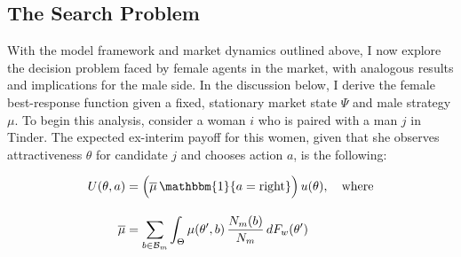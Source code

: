 \begin{comment}
\begin{equation} 
    \underbrace{\lambda_m \Big( F_m(\theta'')-F_m(\theta') \Big)}_{\text{Entering Agents}}\;=\;\underbrace{(1-\delta)N^m(\sigma)}_{\text{Exogenous Deaths}}+\quad  \underbrace{\delta N^m(\sigma)  G^m_b(1 \,|\, \sigma)\int_{\Theta}\sigma_m(\theta,1)\,dG^w_\theta(\theta \,|\, \sigma)}_{\text{Expended Budgets}} 
\end{equation} 

\begin{equation}
    \underbrace{\left(\delta  \int_{\Theta}\sigma_m(\theta,b+1)\,dw_\theta(\theta \,|\, \sigma)\right)N_mR^m_{b+1}}_{\text{Transitions into budget b}}\;=\;\underbrace{\left((1-\delta)+\delta \int_{\Theta} \sigma_m(\theta,b)\,dw_\theta(\theta \,|\, \sigma)\right)N^m R^m_{b}}_{\text{Transitions out of budget b}}
\end{equation}

\begin{equation}
    \underbrace{\lambda_m \Big(F_m(\theta'')-F_m(\theta')\Big)}_{\text{Transitions into budget level B}}\;=\;\underbrace{\left((1-\delta)+\delta \int_{\Theta} \mu(\theta,b)\,dw_\theta(\theta \,|\, \sigma)\right)N_mR^m_{B}}_{\text{Transitions out of budget level B}}
\end{equation} 
\end{comment} 


\subsection{The Search Problem}\label{sec:section2.3}
With the model framework and market dynamics outlined above, I now explore the decision problem faced by female agents in the market, with analogous results and implications for the male side. In the discussion below, I derive the female best-response function given a fixed, stationary market state $\Psi$ and male strategy $\mu$. To begin this analysis, consider a woman $i$ who is paired with a man $j$ in Tinder. The expected ex-interim payoff for this women, given that she observes attractiveness $\theta$ for candidate $j$ and chooses action $a$, is the following:

\begin{equation*}
    \begin{aligned}
        U(\theta, a)&=\Big(\overline{\mu}\,\mathbbm{1}\{a=\text{right}\}\Big)\,u(\theta), \quad \text{where} \\[10pt]
         \overline{\mu} &= \sum_{b\in \mathcal{B}_m}\int_{\Theta} \mu(\theta',b)\,\frac{{N}_m(b)}{N_m}\,dF_w(\theta')
    \end{aligned} 
\end{equation*}

